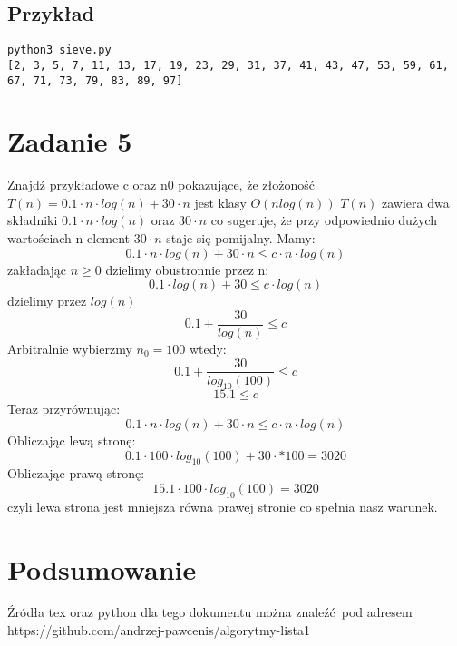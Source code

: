 \documentclass{article}
\begin{document}
		\subsection{Przykład}
			\begin{lstlisting}
python3 sieve.py 
[2, 3, 5, 7, 11, 13, 17, 19, 23, 29, 31, 37, 41, 43, 47, 53, 59, 61, 67, 71, 73, 79, 83, 89, 97]
			\end{lstlisting}
	\section{Zadanie 5}
			Znajdź przykładowe c oraz n0 pokazujące, że złożoność $T(n)=0.1 \cdot n \cdot log(n)+30 \cdot n$ jest klasy $O(nlog(n))$
			$T(n)$ zawiera dwa składniki $0.1 \cdot n \cdot log(n)$ oraz $30 \cdot n$ co sugeruje, że przy odpowiednio dużych wartościach n element $30 \cdot n$ staje się pomijalny.
			Mamy:
			\begin{equation}
				0.1 \cdot n \cdot log(n) + 30 \cdot n \leq c \cdot n \cdot log(n)
			\end{equation}
			zakładając $n \geq 0$ dzielimy obustronnie przez n:
			\begin{equation}
				0.1 \cdot log(n) + 30 \leq c \cdot log(n)
			\end{equation}
			dzielimy przez $log(n)$
			\begin{equation}
				0.1 + \frac{30}{log(n)} \leq c
			\end{equation}
			Arbitralnie wybierzmy $n_0=100$ wtedy:
			\begin{equation}
				0.1 + \frac{30}{log_{10}(100)} \leq c
			\end{equation}
			\begin{equation}
				15.1 \leq c
			\end{equation}
			Teraz przyrównując:
			\begin{equation}
				0.1 \cdot n \cdot log(n) + 30 \cdot n \leq c \cdot n \cdot log(n)
			\end{equation}
			Obliczając lewą stronę:
			\begin{equation}
				0.1 \cdot 100 \cdot log_{10}(100) + 30 \cdot * 100 = 3020
			\end{equation}
			Obliczając prawą stronę:
			\begin{equation}
				15.1 \cdot 100 \cdot log_{10}(100) = 3020
			\end{equation}
			czyli lewa strona jest mniejsza równa prawej stronie co spełnia nasz warunek.
	\section{Podsumowanie}
		Źródła tex oraz python dla tego dokumentu można znaleźć pod adresem https://github.com/andrzej-pawcenis/algorytmy-lista1
\end{document}
